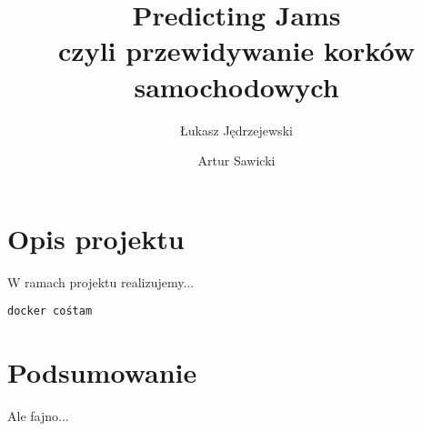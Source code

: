 \documentclass[a4paper,12pt]{mwart}
\begin{document}
\title{Predicting Jams\\%
{\large czyli przewidywanie korków samochodowych} }

\author{Łukasz Jędrzejewski \and Artur Sawicki}

\maketitle

\section{Opis projektu}
W ramach projektu realizujemy...

\scriptsize
\begin{verbatim}
docker cośtam
\end{verbatim}
\normalsize

\section{Podsumowanie}
Ale fajno...
\end{document}
